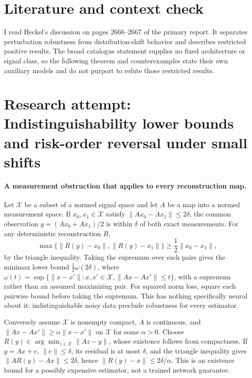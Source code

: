 \documentclass[11pt]{article}
\begin{document}
\section{Literature and context check}

I read Heckel's discussion on pages 2666--2667 of the primary report. It
separates perturbation robustness from distribution-shift behavior and describes
restricted positive results. The broad catalogue statement supplies no fixed
architecture or signal class, so the following theorem and counterexamples state
their own auxiliary models and do not purport to refute those restricted results.

\section{Research attempt: Indistinguishability lower bounds and risk-order reversal under small shifts}

\paragraph{A measurement obstruction that applies to every reconstruction map.}
Let $\mathcal X$ be a subset of a normed signal space and let $A$ be a map
into a normed measurement space. If $x_0,x_1\in\mathcal X$ satisfy
$\|Ax_0-Ax_1\|\leq2\delta$, the common observation
$y=(Ax_0+Ax_1)/2$ is within $\delta$ of both exact measurements.
For any deterministic reconstruction $R$,
\[
 \max\{\|R(y)-x_0\|,\|R(y)-x_1\|\}
 \geq\frac12\|x_0-x_1\|,
\]
by the triangle inequality. Taking the supremum over such pairs gives the
minimax lower bound $\frac12\omega(2\delta)$, where
$\omega(t)=\sup\{\|x-x'\|:x,x'\in\mathcal X,\|Ax-Ax'\|\leq t\}$,
with a supremum rather than an assumed maximizing pair.
For squared norm loss, square each pairwise bound before taking the supremum.
This has nothing specifically neural about it: indistinguishable noisy data
preclude robustness for every estimator.

Conversely assume $\mathcal X$ is nonempty compact, $A$ is continuous, and
$\|Ax-Ax'\|\geq\alpha\|x-x'\|$ on $\mathcal X$ for some $\alpha>0$.
Choose $R(y)\in\arg\min_{z\in\mathcal X}\|Az-y\|$, whose existence follows
from compactness. If $y=Ax+e$, $\|e\|\leq\delta$, its residual is at most
$\delta$, and the triangle inequality gives
$\|AR(y)-Ax\|\leq2\delta$, hence
$\|R(y)-x\|\leq2\delta/\alpha$.
This is an existence bound for a possibly expensive estimator, not a trained
network guarantee.
\end{document}
